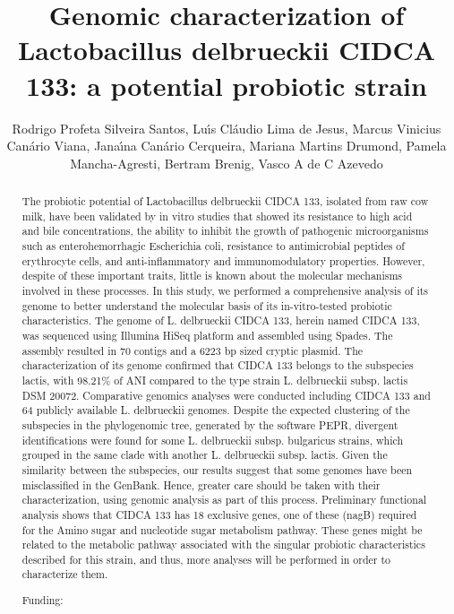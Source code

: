 \documentclass[twoside]{article}
\title{\vspace{-15mm}\fontsize{24pt}{10pt}\selectfont\textbf{ Genomic characterization of Lactobacillus delbrueckii CIDCA 133: a potential probiotic strain }} %
\author{ Rodrigo Profeta Silveira Santos, Lu\'{\i}s Cl\'audio Lima de Jesus, Marcus Vinicius Can\'ario Viana, Jana\'{\i}na Can\'ario Cerqueira, Mariana Martins Drumond, Pamela Mancha-Agresti, Bertram Brenig, Vasco A de C Azevedo }
\affil{ University G\"ottingen }
\date{}
\begin{document}
  
  
  \maketitle %
  
  
  \thispagestyle{fancy} %
  
  
  \begin{abstract}
  The probiotic potential of Lactobacillus delbrueckii CIDCA 133,  isolated from raw cow milk,  have been validated by in vitro studies that showed its resistance to high acid and bile concentrations,  the ability to inhibit the growth of pathogenic microorganisms such as enterohemorrhagic Escherichia coli,  resistance to antimicrobial peptides of erythrocyte cells,  and anti-inflammatory and immunomodulatory properties. However,  despite of these important traits,  little is known about the molecular mechanisms involved in these processes. In this study,  we performed a comprehensive analysis of its genome to better understand the molecular basis of its in-vitro-tested probiotic characteristics. The genome of L. delbrueckii CIDCA 133,  herein named CIDCA 133,  was sequenced using Illumina HiSeq platform and assembled using Spades. The assembly resulted in 70 contigs and a 6223 bp sized cryptic plasmid. The characterization of its genome confirmed that  CIDCA 133 belongs to the subspecies  lactis,  with  98.21\% of ANI compared to the type strain L. delbrueckii subsp. lactis DSM 20072.  Comparative genomics analyses were conducted including  CIDCA 133 and  64 publicly available L. delbrueckii genomes. Despite the expected clustering of the subspecies in the phylogenomic tree,  generated by the software PEPR,  divergent identifications were found for some L. delbrueckii subsp.  bulgaricus strains,  which grouped in the same clade with another L. delbrueckii subsp. lactis. Given the similarity between the subspecies,  our results suggest that some genomes have been misclassified in the GenBank. Hence,  greater care should be taken with their characterization,  using genomic analysis as part of this process. Preliminary functional analysis shows that  CIDCA 133 has 18 exclusive genes,  one of these (nagB) required for the Amino sugar and nucleotide sugar metabolism pathway. These genes might be related to the metabolic pathway associated with the singular probiotic characteristics described for this strain,  and thus,  more analyses will be performed in order to characterize them.
  
  Funding:  \\ 
  \end{abstract}
  
\end{document}
